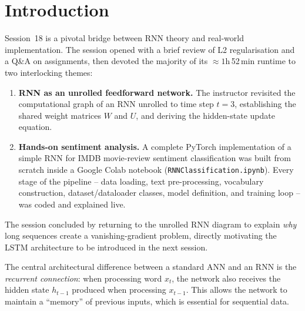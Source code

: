 \documentclass[12pt,a4paper]{article}
\begin{document}
\tableofcontents
\newpage

\section{Introduction}
\label{sec:introduction}

Session~18 is a pivotal bridge between RNN theory and real-world
implementation.  The session opened with a brief review of L2
regularisation and a Q\&A on assignments, then devoted the majority of
its $\approx 1$h\,52\,min runtime to two interlocking themes:

\begin{enumerate}[label=\textbf{\arabic*.}]
  \item \textbf{RNN as an unrolled feedforward network.}  The instructor
        revisited the computational graph of an RNN unrolled to time step
        $t=3$, establishing the shared weight matrices $W$ and $U$, and
        deriving the hidden-state update equation.
  \item \textbf{Hands-on sentiment analysis.}  A complete PyTorch
        implementation of a simple RNN for IMDB movie-review sentiment
        classification was built from scratch inside a Google Colab
        notebook (\texttt{RNNClassification.ipynb}).  Every stage of the
        pipeline -- data loading, text pre-processing, vocabulary
        construction, dataset/dataloader classes, model definition, and
        training loop -- was coded and explained live.
\end{enumerate}

The session concluded by returning to the unrolled RNN diagram to
explain \emph{why} long sequences create a vanishing-gradient problem,
directly motivating the LSTM architecture to be introduced in the
next session.

\begin{keyinsight}
The central architectural difference between a standard ANN and an RNN
is the \emph{recurrent connection}: when processing word $x_t$, the
network also receives the hidden state $h_{t-1}$ produced when
processing $x_{t-1}$.  This allows the network to maintain a
``memory'' of previous inputs, which is essential for sequential data.
\end{keyinsight}

\end{document}
